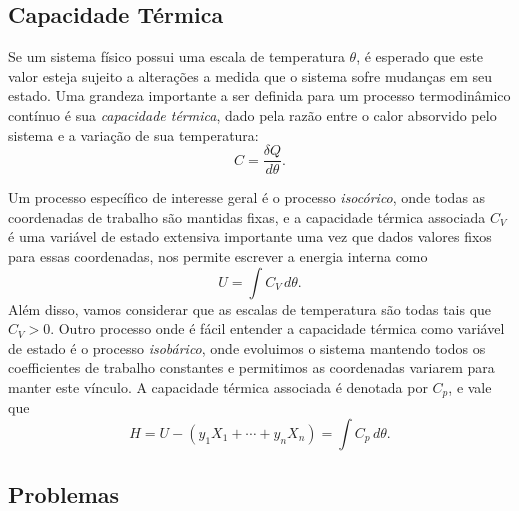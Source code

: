 \subsection{Capacidade Térmica}

Se um sistema físico possui uma escala de temperatura $\theta$, é esperado que
este valor esteja sujeito a alterações a medida que o sistema sofre mudanças em
seu estado. Uma grandeza importante a ser definida para um processo
termodinâmico contínuo é sua \emph{capacidade térmica}, dado pela razão entre o
calor absorvido pelo sistema e a variação de sua temperatura:
$$C=\frac{\delta Q}{d\theta}.$$

Um processo específico de interesse geral é o processo \emph{isocórico}, onde
todas as coordenadas de trabalho são mantidas fixas, e a capacidade térmica
associada $C_V$ é uma variável de estado extensiva importante uma vez que dados
valores fixos para essas coordenadas, nos permite escrever a energia interna
como
$$U=\int C_V\,d\theta.$$
Além disso, vamos considerar que as escalas de temperatura são todas tais que
$C_V>0$. Outro processo onde é fácil entender a capacidade térmica como variável
de estado é o processo \emph{isobárico}, onde evoluimos o sistema mantendo todos
os coefficientes de trabalho constantes e permitimos as coordenadas variarem
para manter este vínculo. A capacidade térmica associada é denotada por $C_p$, e
vale que
$$H=U-(y_1X_1+\cdots+y_nX_n)=\int C_p\,d\theta.$$

\subsection{Problemas}

